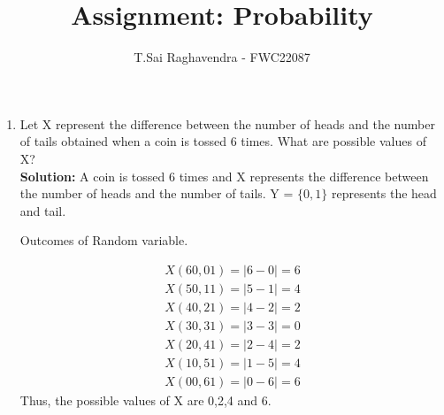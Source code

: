 \documentclass{article}
\newcommand{\solution}{\noindent \textbf{Solution: }}
\begin{document}
\title{Assignment: Probability}
\author{\Large T.Sai Raghavendra - FWC22087}
\date{}


\maketitle
\begin{enumerate}[label=13.\arabic{enumi}.\arabic{enumii}]%
\setcounter{enumi}{3}
\setcounter{enumii}{3}

\item Let X represent the difference between the number of heads and the number of tails obtained when a coin is tossed 6 times. What are possible values of X?\\

\solution
A coin is tossed 6 times and X represents the difference between the number of heads and the number of tails.
Y = $\{0,1\}$ represents the head and tail.\\

	\begin{table}[h]
	\centering
	
	\caption{Outcomes of Random variable.}
	\label{tables:13.4.3.2}
	\end{table}
	
\begin{align}
X(60,01) = |6-0| = 6\\
X(50,11) = |5-1| = 4\\
X(40,21) = |4-2| = 2\\
X(30,31) = |3-3| = 0\\
X(20,41) = |2-4| = 2\\
X(10,51) = |1-5| = 4\\
X(00,61) = |0-6| = 6
\end{align}
Thus, the possible values of X are 0,2,4 and 6.
\end{enumerate}
\end{document}
